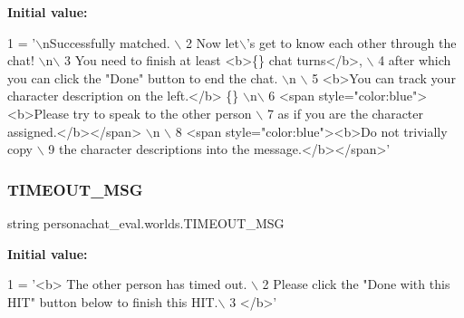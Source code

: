 {\bfseries Initial value\+:}
\begin{DoxyCode}
1 =  \textcolor{stringliteral}{'\(\backslash\)nSuccessfully matched. \(\backslash\)}
2 \textcolor{stringliteral}{        Now let\(\backslash\)'s get to know each other through the chat! \(\backslash\)n\(\backslash\)}
3 \textcolor{stringliteral}{        You need to finish at least <b>\{\} chat turns</b>, \(\backslash\)}
4 \textcolor{stringliteral}{        after which you can click the "Done" button to end the chat. \(\backslash\)n \(\backslash\)}
5 \textcolor{stringliteral}{        <b>You can track your character description on the left.</b> \{\} \(\backslash\)n\(\backslash\)}
6 \textcolor{stringliteral}{        <span style="color:blue"><b>Please try to speak to the other person \(\backslash\)}
7 \textcolor{stringliteral}{        as if you are the character assigned.</b></span> \(\backslash\)n \(\backslash\)}
8 \textcolor{stringliteral}{        <span style="color:blue"><b>Do not trivially copy \(\backslash\)}
9 \textcolor{stringliteral}{        the character descriptions into the message.</b></span>'}
\end{DoxyCode}
\mbox{\label{namespacepersonachat__eval_1_1worlds_aebdfc7aa4e7d13041838bf4740af68e9}} 
\subsubsection{\texorpdfstring{T\+I\+M\+E\+O\+U\+T\+\_\+\+M\+SG}{TIMEOUT\_MSG}}
{\footnotesize\ttfamily string personachat\+\_\+eval.\+worlds.\+T\+I\+M\+E\+O\+U\+T\+\_\+\+M\+SG}

{\bfseries Initial value\+:}
\begin{DoxyCode}
1 =  \textcolor{stringliteral}{'<b> The other person has timed out. \(\backslash\)}
2 \textcolor{stringliteral}{        Please click the "Done with this HIT" button below to finish this HIT.\(\backslash\)}
3 \textcolor{stringliteral}{        </b>'}
\end{DoxyCode}
\mbox{\label{namespacepersonachat__eval_1_1worlds_ad28f2b18e12e7f7c40cd1e74a70ed2f3}} 
